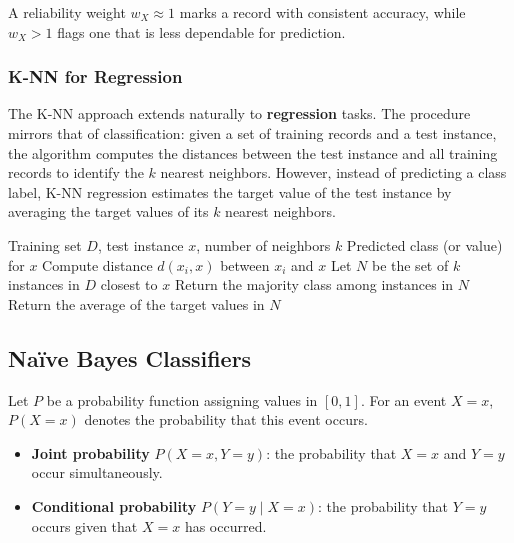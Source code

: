 A reliability weight \(w_X \approx 1\) marks a record with consistent accuracy, while \(w_X > 1\) flags one that is less dependable for prediction.



\subsubsection{K-NN for Regression}

The K-NN approach extends naturally to \textbf{regression} tasks. The procedure mirrors that of classification: given a set of training records and a test instance, the algorithm computes the distances between the test instance and all training records to identify the \(k\) nearest neighbors. However, instead of predicting a class label, K-NN regression estimates the target value of the test instance by averaging the target values of its \(k\) nearest neighbors.



\begin{algorithm}
\caption{K-Nearest Neighbors Algorithm}
\begin{algorithmic}[1]
\Require Training set $D$, test instance $x$, number of neighbors $k$
\Ensure Predicted class (or value) for $x$
    \State Compute distance $d(x_i, x)$ between $x_i$ and $x$
\EndFor
\State Let $N$ be the set of $k$ instances in $D$ closest to $x$
    \State Return the majority class among instances in $N$
    \State Return the average of the target values in $N$
\EndIf
\end{algorithmic}
\end{algorithm}

\subsection{Na\"ive Bayes Classifiers}
Let $P$ be a probability function assigning values in $[0, 1]$. For an event $X = x$, $P(X = x)$ denotes the probability that this event occurs.

\begin{itemize}
    \item \textbf{Joint probability} $P(X = x, Y = y)$: the probability that $X = x$ and $Y = y$ occur simultaneously.
    \item \textbf{Conditional probability} $P(Y = y \mid X = x)$: the probability that $Y = y$ occurs given that $X = x$ has occurred.
\end{itemize}

